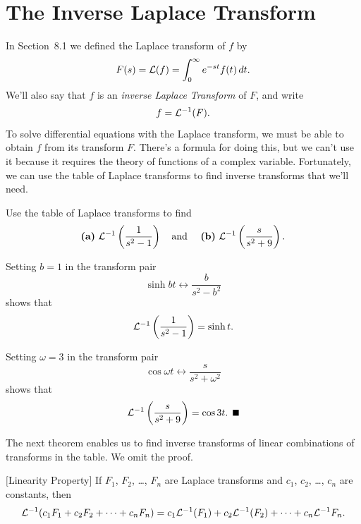 \section{The Inverse Laplace Transform}

\noindent
{}

\noindent
In Section~8.1 we defined the Laplace transform of $f$ by
\[
  F(s)={\cal L}(f)=\int_{0}^{\infty}e^{-st}f(t)\,dt.
\]
We'll also say that $f$ is an {\color{blue}\it inverse Laplace Transform\/} of $F$, and write
\[
  f={\cal L}^{-1}(F).
\]
To solve differential equations with the Laplace transform, we must be able to obtain $f$ from its
transform $F$. There's a formula for doing this, but we can't use it because it requires the theory
of functions of a complex variable. Fortunately, we can use the table of Laplace transforms to find
inverse transforms that we'll need.

\begin{example}
  \label{example:8.2.1}\rm Use the table of Laplace transforms to find
  \[
    \mbox{{\bf (a)}
    }{\cal L}^{-1}\left(\frac{1}{s^{2}-1}\right) \mbox{\quad and \quad {\bf (b)} }{\cal L}^{-1}\left(\frac{s}{s^{2}+9}\right).
  \]
\end{example}

\begin{examplesolution}
 Setting $b=1$ in the transform pair
\[
  \sinh bt\leftrightarrow\frac{b}{s^{2}-b^{2}}
\]
shows that
\[
  {\cal L}^{-1}\left(\frac{1}{s^{2}-1}\right)=\sinh t.
\]

 Setting $\omega=3$ in the transform pair
\[
  \cos\omega t\leftrightarrow\frac{s}{s^{2}+\omega^{2}}
\]
shows that
\[
  {\cal L}^{-1}\left(\frac{s}{s^{2}+9}\right)=\cos3t.\bbox
\]
\end{examplesolution}

The next theorem enables us to find inverse transforms of linear combinations of transforms in the
table. We omit the proof.

\begin{theorem}
  \color{blue}
  $[$Linearity Property$]$\label{thmtype:8.2.1} If $F_{1}$, $F_{2}$, \dots, $F_{n}$ are Laplace
  transforms and $c_{1}$, $c_{2}$, \dots, $c_{n}$ are constants, then
  \[
    {\cal L}^{-1}(c_{1}F_{1}+c_{2}F_{2}+\cdots+c_{n}F_{n})=c_{1}{\cal L}^{-1}(F_{1})+c_{2}{\cal L}^{-1}(F_{2})+\cdots+c_{n}{\cal L}^{-1}F_{n}.
  \]
\end{theorem}

